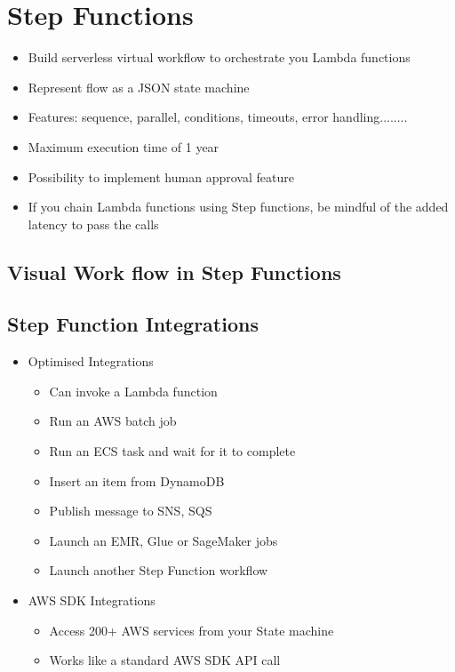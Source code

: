 \section{Step Functions}
\begin{itemize}
    \item Build serverless virtual workflow to orchestrate you Lambda functions
    \item Represent flow as a JSON state machine
    \item Features: sequence, parallel, conditions, timeouts, error handling........
    \item Maximum execution time of 1 year
    \item Possibility to implement human approval feature
    \item If you chain Lambda functions using Step functions, be mindful of the added latency to pass the calls
\end{itemize}

\subsection{Visual Work flow in Step Functions}

\subsection{Step Function Integrations}
\begin{itemize}
    \item Optimised Integrations
    \begin{itemize}
        \item Can invoke a Lambda function
        \item Run an AWS batch job
        \item Run an ECS task and wait for it to complete
        \item Insert an item from DynamoDB
        \item Publish message to SNS, SQS
        \item Launch an EMR, Glue or SageMaker jobs
        \item Launch another Step Function workflow
    \end{itemize}
    \item AWS SDK Integrations
    \begin{itemize}
        \item Access 200+ AWS services from your State machine
        \item Works like a standard AWS SDK API call
    \end{itemize}
\end{itemize}

